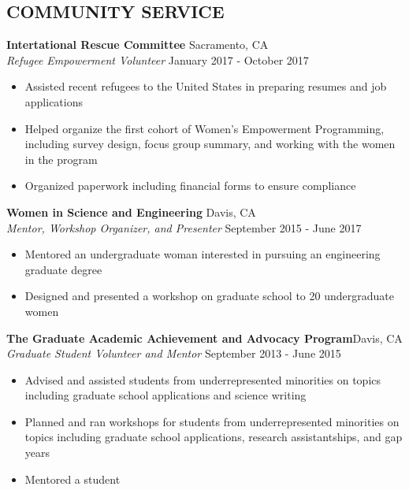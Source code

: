 \documentclass[line,margin,10pt]{res}
\begin{document}
\begin{resume}

\section{COMMUNITY SERVICE}
\textbf{Intertational Rescue Committee}\hfill
Sacramento, CA\\
{\sl Refugee Empowerment Volunteer} \hfill January 2017 - October 2017
\begin{itemize}
\item Assisted recent refugees to the United States in preparing resumes and job applications
\item Helped organize the first cohort of Women's Empowerment Programming, including survey design, focus group summary, and working with the women in the program
\item Organized paperwork including financial forms to ensure compliance %
\end{itemize}

\textbf{Women in Science and Engineering}\hfill
Davis, CA\\
{\sl Mentor, Workshop Organizer, and Presenter} \hfill September 2015 - June 2017
\begin{itemize}
\item Mentored an undergraduate woman interested in pursuing an engineering graduate degree
\item Designed and presented a workshop on graduate school to 20 undergraduate women
\end{itemize}

\textbf{The Graduate Academic Achievement and Advocacy Program}\hfill Davis, CA\\{\sl Graduate Student Volunteer and Mentor} \hfill September 2013 - June 2015
\begin{itemize}
\item Advised and assisted students from underrepresented minorities on topics including graduate school applications and science writing
\item Planned and ran workshops for students from underrepresented minorities on topics including graduate school applications, research assistantships, and gap years
\item Mentored a student
\end{itemize}


\end{resume}
\end{document}
